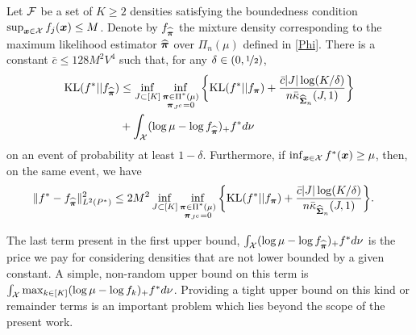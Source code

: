 \begin{proposition}\label{prop:2}
	Let $\cal F$ be a set of $K\ge 2$ densities satisfying the boundedness condition
	$\sup_{\boldsymbol x\in\mathcal X} f_j(\boldsymbol x)\le M$. Denote by $f_{\widehat{\boldsymbol \pi}}$ the mixture density
	corresponding to the maximum likelihood estimator $\widehat{\boldsymbol \pi}$ over $\Pi_n(\mu)$
	defined in \eqref{Phi}. There is a constant $\bar c\le 128 M^2V^4$ such that,
	for any $\delta \in (0,\nicefrac12)$,
	\begin{align}
	{\rm KL}(f^*|| f_{\widehat{\boldsymbol \pi}}) &\leq \inf_{J\subset [K]}
	\inf_{\substack{\boldsymbol \pi \in \Pi^*(\mu)\\ \boldsymbol \pi_{J^c}=0}}\bigg\{ {\rm KL}(f^*|| f_{\boldsymbol \pi})
	+ \frac{\bar c|J|\log(K/\delta)}{n\bar\kappa_{\widehat{\boldsymbol\Sigma}_n}(J,1)}\bigg\} \nonumber\\
	&+\int_{\mathcal X}(\log\mu-\log f_{\widehat{\boldsymbol \pi}})_+f^*d\nu
	\label{boundDevFive}
	\end{align}
	on an event of probability at least $1-\delta$. Furthermore, if $\inf_{\boldsymbol x\in\mathcal X} f^*(\boldsymbol x)
	\ge \mu$, then, on the same event, we have
	\begin{align}
	\|f^*-f_{\widehat{\boldsymbol \pi}}\|_{L^2(P^*)}^2
	&\leq 2M^2\inf_{J\subset [K]}\inf_{\substack{\boldsymbol \pi \in \Pi^*(\mu)\\ \boldsymbol \pi_{J^c}=0}}
	\bigg\{ {\rm KL}(f^*|| f_{\boldsymbol \pi}) + \frac{\bar c|J|\log(K/\delta)}{
		n\bar\kappa_{\widehat{\boldsymbol\Sigma}_n}(J,1)}\bigg\}.
	\label{boundDevSix}
	\end{align}
\end{proposition}

The last term present in the first upper bound,  $\int_{\mathcal X}(\log\mu-\log f_{\widehat{\boldsymbol \pi}})_+f^*d\nu$
is the price we pay for considering densities that are not lower bounded by a given constant.
A simple, non-random upper bound on this term is $\int_{\mathcal X}\max_{k\in [K]}(\log\mu-\log f_k)_+f^*d\nu$.
Providing a tight upper bound on this kind or remainder terms is an important problem which lies
beyond the scope of the present work.





